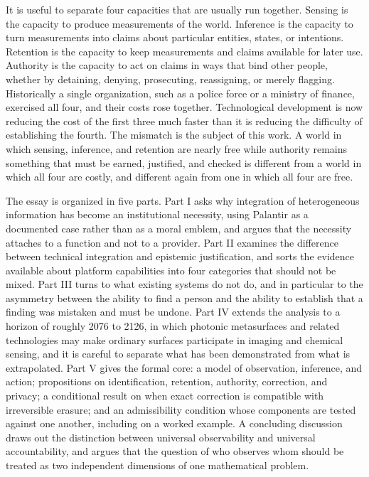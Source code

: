 \documentclass[11pt]{article}
\theoremstyle{plain}
\theoremstyle{definition}
\theoremstyle{remark}
\begin{document}
It is useful to separate four capacities that are usually run together. Sensing is the capacity to produce measurements of the world. Inference is the capacity to turn measurements into claims about particular entities, states, or intentions. Retention is the capacity to keep measurements and claims available for later use. Authority is the capacity to act on claims in ways that bind other people, whether by detaining, denying, prosecuting, reassigning, or merely flagging. Historically a single organization, such as a police force or a ministry of finance, exercised all four, and their costs rose together. Technological development is now reducing the cost of the first three much faster than it is reducing the difficulty of establishing the fourth. The mismatch is the subject of this work. A world in which sensing, inference, and retention are nearly free while authority remains something that must be earned, justified, and checked is different from a world in which all four are costly, and different again from one in which all four are free.

The essay is organized in five parts. Part I asks why integration of heterogeneous information has become an institutional necessity, using Palantir as a documented case rather than as a moral emblem, and argues that the necessity attaches to a function and not to a provider. Part II examines the difference between technical integration and epistemic justification, and sorts the evidence available about platform capabilities into four categories that should not be mixed. Part III turns to what existing systems do not do, and in particular to the asymmetry between the ability to find a person and the ability to establish that a finding was mistaken and must be undone. Part IV extends the analysis to a horizon of roughly 2076 to 2126, in which photonic metasurfaces and related technologies may make ordinary surfaces participate in imaging and chemical sensing, and it is careful to separate what has been demonstrated from what is extrapolated. Part V gives the formal core: a model of observation, inference, and action; propositions on identification, retention, authority, correction, and privacy; a conditional result on when exact correction is compatible with irreversible erasure; and an admissibility condition whose components are tested against one another, including on a worked example. A concluding discussion draws out the distinction between universal observability and universal accountability, and argues that the question of who observes whom should be treated as two independent dimensions of one mathematical problem.
\end{document}
